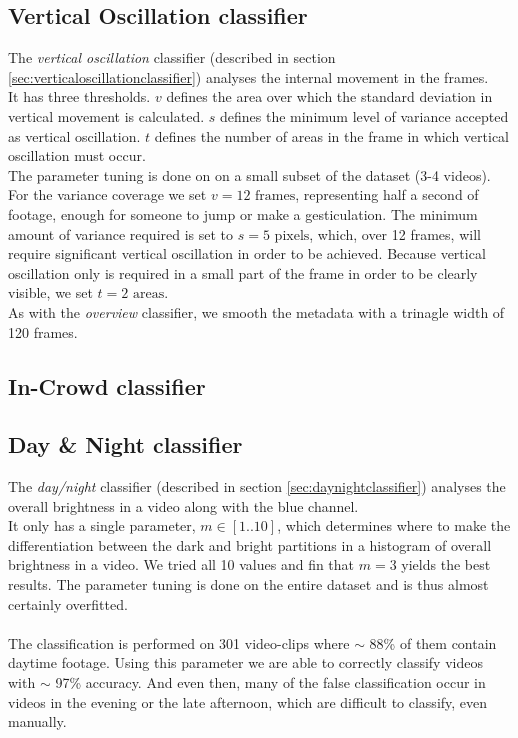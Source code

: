 \subsection{Vertical Oscillation classifier}
%
The \textit{vertical oscillation} classifier (described in section \ref{sec:verticaloscillationclassifier}) analyses the internal movement in the frames.\\
It has three thresholds. $v$ defines the area over which the standard deviation in vertical movement is calculated. $s$ defines the minimum level of variance accepted as vertical oscillation. $t$ defines the number of areas in the frame in which vertical oscillation must occur.\\
The parameter tuning is done on on a small subset of the dataset (3-4 videos). For the variance coverage we set $v = 12 \text{ frames}$, representing half a second of footage, enough for someone to jump or make a gesticulation. The minimum amount of variance required is set to $s = 5 \text{ pixels}$, which, over 12 frames, will require significant vertical oscillation in order to be achieved. Because vertical oscillation only is required in a small part of the frame in order to be clearly visible, we set $t = 2 \text{ areas}$.\\
As with the \textit{overview} classifier, we smooth the metadata with a trinagle width of 120 frames.
%
\subsection{In-Crowd classifier}
%
\subsection{Day \& Night classifier}
%
The \textit{day/night} classifier (described in section \ref{sec:daynightclassifier}) analyses the overall brightness in a video along with the blue channel.\\
It only has a single parameter, $m\in [1..10]$, which determines where to make the differentiation between the dark and bright partitions in a histogram of overall brightness in a video. We tried all 10 values and fin that $m = 3$ yields the best results. The parameter tuning is done on the entire dataset and is thus almost certainly overfitted.\\\\
%
The classification is performed on 301 video-clips where $\sim$ 88\% of them contain daytime footage. Using this parameter we are able to correctly classify videos with $\sim$ 97\% accuracy. And even then, many of the false classification occur in videos in the evening or the late afternoon, which are difficult to classify, even manually.
